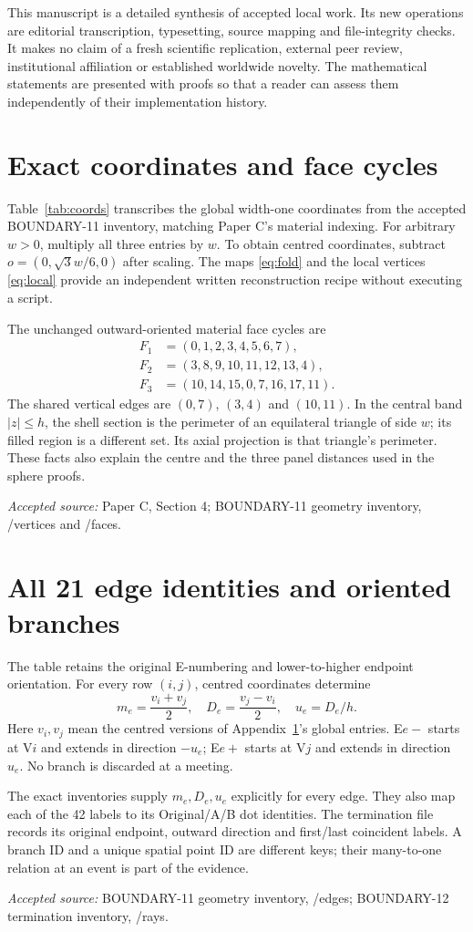 \documentclass[11pt,a4paper]{article}
\newcommand{\source}[1]{\par{\small\emph{Accepted source:} #1}\par}
\begin{document}
This manuscript is a detailed synthesis of accepted local work. Its new operations are editorial transcription, typesetting, source mapping and file-integrity checks. It makes no claim of a fresh scientific replication, external peer review, institutional affiliation or established worldwide novelty. The mathematical statements are presented with proofs so that a reader can assess them independently of their implementation history.

\clearpage\appendix
\section{Exact coordinates and face cycles}\label{app:coordinates}
Table~\ref{tab:coords} transcribes the global width-one coordinates from the accepted BOUNDARY-11 inventory, matching Paper C's material indexing. For arbitrary $w>0$, multiply all three entries by $w$. To obtain centred coordinates, subtract $o=(0,\sqrt3w/6,0)$ after scaling. The maps \eqref{eq:fold} and the local vertices \eqref{eq:local} provide an independent written reconstruction recipe without executing a script.

The unchanged outward-oriented material face cycles are
\begin{equation}\label{eq:cyclesfaces}
\begin{aligned}
F_1&=(0,1,2,3,4,5,6,7),\\
F_2&=(3,8,9,10,11,12,13,4),\\
F_3&=(10,14,15,0,7,16,17,11).
\end{aligned}
\end{equation}
The shared vertical edges are $(0,7)$, $(3,4)$ and $(10,11)$. In the central band $|z|\leq h$, the shell section is the perimeter of an equilateral triangle of side $w$; its filled region is a different set. Its axial projection is that triangle's perimeter. These facts also explain the centre and the three panel distances used in the sphere proofs.
\source{Paper C, Section 4; BOUNDARY-11 geometry inventory, /vertices and /faces.}

\clearpage\section{All 21 edge identities and oriented branches}\label{app:edges}
The table retains the original E-numbering and lower-to-higher endpoint orientation. For every row $(i,j)$, centred coordinates determine
\[
m_e=\frac{v_i+v_j}{2},\quad D_e=\frac{v_j-v_i}{2},\quad u_e=D_e/h.
\]
Here $v_i,v_j$ mean the centred versions of Appendix~\ref{app:coordinates}'s global entries. E$e-$ starts at V$i$ and extends in direction $-u_e$; E$e+$ starts at V$j$ and extends in direction $u_e$. No branch is discarded at a meeting.

The exact inventories supply $m_e,D_e,u_e$ explicitly for every edge. They also map each of the 42 labels to its Original/A/B dot identities. The termination file records its original endpoint, outward direction and first/last coincident labels. A branch ID and a unique spatial point ID are different keys; their many-to-one relation at an event is part of the evidence.
\source{BOUNDARY-11 geometry inventory, /edges; BOUNDARY-12 termination inventory, /rays.}
\end{document}
